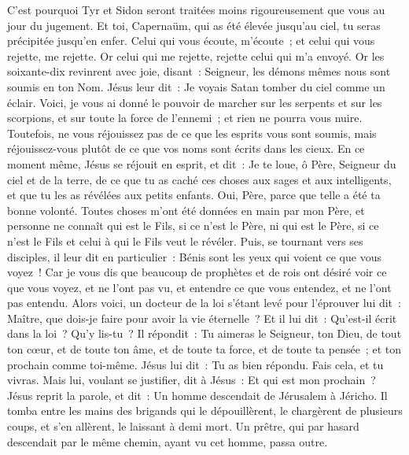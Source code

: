 \begin{multicols}{2}
C'est pourquoi Tyr et Sidon seront traitées moins rigoureusement que vous au jour du jugement.
Et toi, Capernaüm, qui as été élevée jusqu'au ciel, tu seras précipitée jusqu'en enfer.
Celui qui vous écoute, m'écoute~; et celui qui vous rejette, me rejette. Or celui qui me rejette, rejette celui qui m'a envoyé.
Or les soixante-dix revinrent avec joie, disant~: Seigneur, les démons mêmes nous sont soumis en ton Nom.
Jésus leur dit~: Je voyais Satan tomber du ciel comme un éclair.
Voici, je vous ai donné le pouvoir de marcher sur les serpents et sur les scorpions, et sur toute la force de l'ennemi~; et rien ne pourra vous nuire.
Toutefois, ne vous réjouissez pas de ce que les esprits vous sont soumis, mais réjouissez-vous plutôt de ce que vos noms sont écrits dans les cieux.
En ce moment même, Jésus se réjouit en esprit, et dit~: Je te loue, ô Père, Seigneur du ciel et de la terre, de ce que tu as caché ces choses aux sages et aux intelligents, et que tu les as révélées aux petits enfants. Oui, Père, parce que telle a été ta bonne volonté.
Toutes choses m'ont été données en main par mon Père, et personne ne connaît qui est le Fils, si ce n'est le Père, ni qui est le Père, si ce n'est le Fils et celui à qui le Fils veut le révéler.
Puis, se tournant vers ses disciples, il leur dit en particulier~: Bénis sont les yeux qui voient ce que vous voyez~!
Car je vous dis que beaucoup de prophètes et de rois ont désiré voir ce que vous voyez, et ne l'ont pas vu, et entendre ce que vous entendez, et ne l'ont pas entendu.
Alors voici, un docteur de la loi s'étant levé pour l'éprouver lui dit~: Maître, que dois-je faire pour avoir la vie éternelle~?
Et il lui dit~: Qu'est-il écrit dans la loi~? Qu'y lis-tu~?
Il répondit~: Tu aimeras le Seigneur, ton Dieu, de tout ton cœur, et de toute ton âme, et de toute ta force, et de toute ta pensée~; et ton prochain comme toi-même.
Jésus lui dit~: Tu as bien répondu. Fais cela, et tu vivras.
Mais lui, voulant se justifier, dit à Jésus~: Et qui est mon prochain~?
Jésus reprit la parole, et dit~: Un homme descendait de Jérusalem à Jéricho. Il tomba entre les mains des brigands qui le dépouillèrent, le chargèrent de plusieurs coups, et s'en allèrent, le laissant à demi mort.
Un prêtre, qui par hasard descendait par le même chemin, ayant vu cet homme, passa outre.

\end{multicols}
